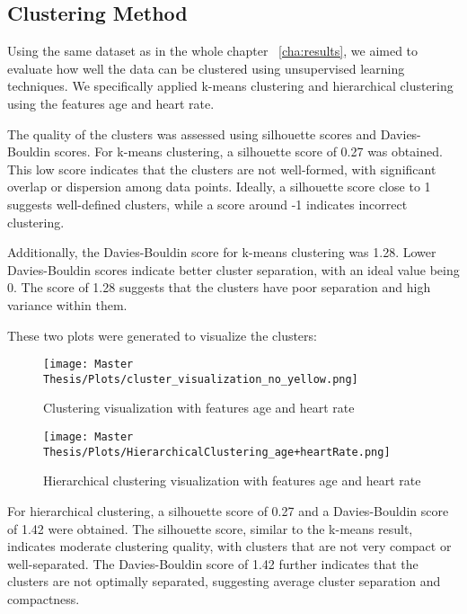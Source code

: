 \subsection{Clustering Method}

Using the same dataset as in the whole chapter ~\ref{cha:results}, we aimed to evaluate how well the data can be clustered using unsupervised learning techniques. We specifically applied k-means clustering and hierarchical clustering using the features age and heart rate.

The quality of the clusters was assessed using silhouette scores and Davies-Bouldin scores. For k-means clustering, a silhouette score of 0.27 was obtained. This low score indicates that the clusters are not well-formed, with significant overlap or dispersion among data points. Ideally, a silhouette score close to 1 suggests well-defined clusters, while a score around -1 indicates incorrect clustering.

Additionally, the Davies-Bouldin score for k-means clustering was 1.28. Lower Davies-Bouldin scores indicate better cluster separation, with an ideal value being 0. The score of 1.28 suggests that the clusters have poor separation and high variance within them.

These two plots were generated to visualize the clusters:

\FloatBarrier
\begin{figure}[h!]
\centering
\texttt{[image: Master Thesis/Plots/cluster\_visualization\_no\_yellow.png]}
\caption{Clustering visualization with features age and heart rate}
\label{figure:clusterageHR}
\end{figure}

\begin{figure}[h!]
\centering
\texttt{[image: Master Thesis/Plots/HierarchicalClustering\_age+heartRate.png]}
\caption{Hierarchical clustering visualization with features age and heart rate}
\label{figure:hirclusterageHR}
\end{figure}
\FloatBarrier

For hierarchical clustering, a silhouette score of 0.27 and a Davies-Bouldin score of 1.42 were obtained. The silhouette score, similar to the k-means result, indicates moderate clustering quality, with clusters that are not very compact or well-separated. The Davies-Bouldin score of 1.42 further indicates that the clusters are not optimally separated, suggesting average cluster separation and compactness.

